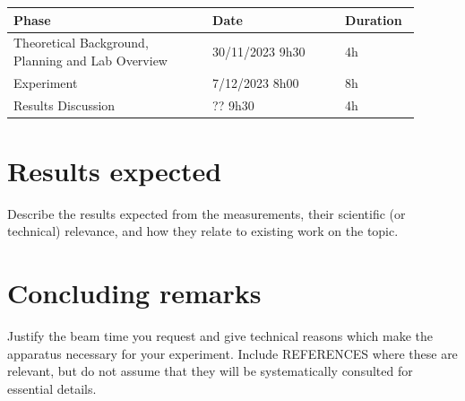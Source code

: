 \documentclass{article}
\begin{document}
\begin{multicols}{2}
\begin{table}[H]
\centering
\begin{tabular}{|w{0.45\linewidth}|w{0.3\linewidth}|w{0.15\linewidth}|}
\hline
Phase & Date & Duration \\ \hline
Theoretical Background, Planning and Lab Overview & 30/11/2023 9h30 & 4h \\ \hline
Experiment & 7/12/2023 8h00 & 8h \\ \hline
Results Discussion & ?? 9h30 & 4h \\ \hline
\end{tabular}
\end{table}

\section{Results expected}

Describe the results expected from the measurements, their scientific (or technical) relevance, and how they relate to existing work on the topic.

\paragraph{}



\section{Concluding remarks}

Justify the beam time you request and give technical reasons which make the apparatus necessary for your experiment. Include REFERENCES where these are relevant, but do not assume that they will be systematically consulted for essential details.

\printbibliography
\nocite{*}

\end{multicols}
\end{document}
